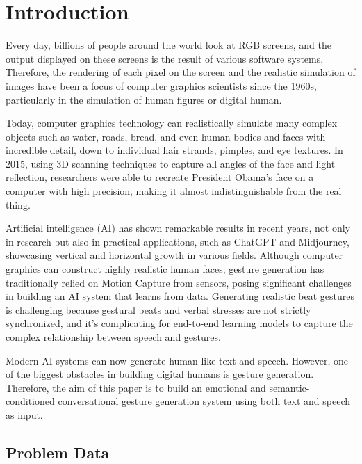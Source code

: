 \section{Introduction}
\label{sec:introduction}

Every day, billions of people around the world look at RGB screens, and the output displayed on these screens is the result of various software systems. Therefore, the rendering of each pixel on the screen and the realistic simulation of images have been a focus of computer graphics scientists since the 1960s, particularly in the simulation of human figures or digital human.

Today, computer graphics technology can realistically simulate many complex objects such as water, roads, bread, and even human bodies and faces with incredible detail, down to individual hair strands, pimples, and eye textures. In 2015, using 3D scanning techniques \cite{metallo2015scanning} to capture all angles of the face and light reflection, researchers were able to recreate President Obama's face on a computer with high precision, making it almost indistinguishable from the real thing.

Artificial intelligence (AI) has shown remarkable results in recent years, not only in research but also in practical applications, such as ChatGPT and Midjourney, showcasing vertical and horizontal growth in various fields. Although computer graphics can construct highly realistic human faces, gesture generation has traditionally relied on Motion Capture from sensors, posing significant challenges in building an AI system that learns from data. Generating realistic beat gestures is challenging because gestural beats and verbal stresses are not strictly synchronized, and it's complicating for end-to-end learning models to capture the complex relationship between speech and gestures.



Modern AI systems can now generate human-like text and speech. However, one of the biggest obstacles in building digital humans is gesture generation. Therefore, the aim of this paper is to build an emotional and semantic-conditioned conversational gesture generation system using both text and speech as input.



\subsection{Problem Data}
\label{sec:Data}

